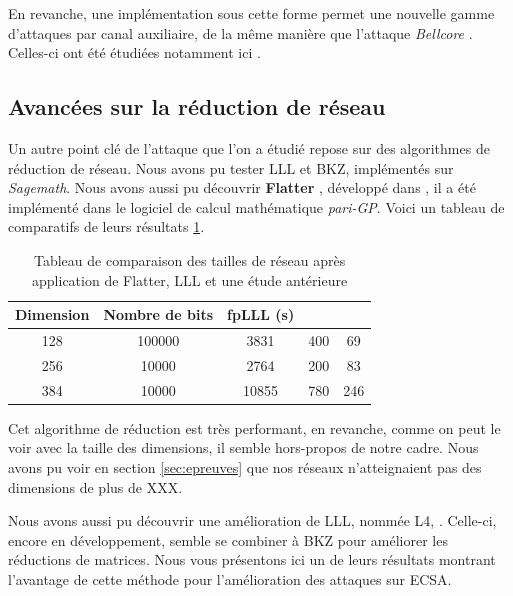\documentclass{backend}
\begin{document}
En revanche, une implémentation sous cette forme permet une nouvelle gamme d'attaques par canal auxiliaire, de la même manière que l'attaque \textit{Bellcore} \cite{Bellcore}. Celles-ci ont été étudiées notamment ici  \cite{wNaf_attack}.

\subsection{Avancées sur la réduction de réseau}

Un autre point clé de l'attaque que l'on a étudié repose sur des algorithmes de réduction de réseau. Nous avons pu tester LLL et BKZ, implémentés sur \textit{Sagemath}. Nous avons aussi pu découvrir \textbf{Flatter} \cite{flatter}, développé dans , il a été implémenté dans le logiciel de calcul mathématique \textit{pari-GP}. Voici un tableau de comparatifs de leurs résultats \ref{tab:flatter}.

\begin{center}
    \begin{table}[H]
        \caption{Tableau de comparaison des tailles de réseau après application de Flatter, LLL et une étude antérieure}
        \label{tab:flatter}
        \centering
        \begin{tabular}{|c|c|c|c|c|}
        \hline
        \textbf{Dimension} & \textbf{Nombre de bits} & \textbf{fpLLL (s)} & \textbf{\cite{ref32}} & \textbf{\cite{flatter}} \\
        \hline
        128 & 100000 & 3831 & 400 & 69 \\
        \hline
        256 & 10000 & 2764 & 200 & 83 \\
        \hline
        384 & 10000 & 10855 & 780 & 246 \\
        \hline
        \end{tabular}
    \end{table}
\end{center}

Cet algorithme de réduction est très performant, en revanche, comme on peut le voir avec la taille des dimensions, il semble hors-propos de notre cadre. Nous avons pu voir en section \ref{sec:epreuves} que nos réseaux n'atteignaient pas des dimensions de plus de XXX.


Nous avons aussi pu découvrir une amélioration de LLL, nommée L4,  \cite{l4}. Celle-ci, encore en développement, semble se combiner à BKZ pour améliorer les réductions de matrices. Nous vous présentons ici un de leurs résultats montrant l'avantage de cette méthode pour l'amélioration des attaques sur ECSA.
\end{document}
